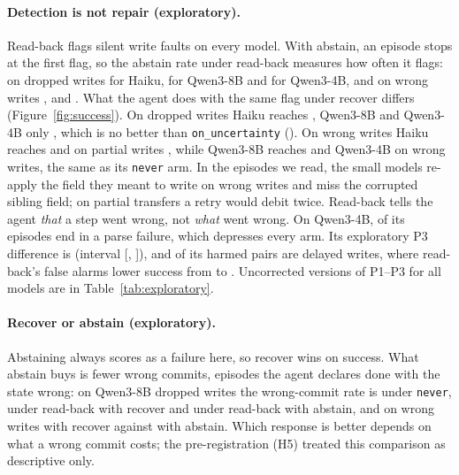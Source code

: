 \paragraph{Detection is not repair (exploratory).} Read-back flags silent write faults on every
model. With abstain, an episode stops at the first flag, so the abstain rate under read-back measures
how often it flags: on dropped writes \RHaikuDropReadbackAbstainAbstainRate{} for Haiku,
\RQwenEightDropReadbackAbstainAbstainRate{} for Qwen3-8B and \RQwenFourDropReadbackAbstainAbstainRate{}
for Qwen3-4B, and on wrong writes \RHaikuWrongReadbackAbstainAbstainRate{},
\RQwenEightWrongReadbackAbstainAbstainRate{} and \RQwenFourWrongReadbackAbstainAbstainRate{}. What the
agent does with the same flag under recover differs (Figure~\ref{fig:success}). On dropped writes Haiku
reaches \RHaikuDropReadbackSuccess{}, Qwen3-8B \RQwenEightDropReadbackSuccess{} and Qwen3-4B only
\RQwenFourDropReadbackSuccess{}, which is no better than \texttt{on\_uncertainty}
(\RQwenFourDropOnUncSuccess{}). On wrong writes Haiku reaches \RHaikuWrongReadbackSuccess{} and on
partial writes \RHaikuPartialReadbackSuccess{}, while Qwen3-8B reaches
\RQwenEightWrongReadbackSuccess{} and Qwen3-4B \RQwenFourWrongReadbackSuccess{} on wrong writes, the
same as its \texttt{never} arm. In the episodes we read, the small models re-apply the field they meant
to write on wrong writes and miss the corrupted sibling field; on partial transfers a retry would debit
twice. Read-back tells the agent \emph{that} a step went wrong, not \emph{what} went wrong. On
Qwen3-4B, \RExpQwenFourStatusParseFailure{} of its \RExpQwenFourEpisodes{} episodes end in a parse
failure, which depresses every arm. Its exploratory P3 difference is \RExpQwenFourPThreeDiff{}
(interval [\RExpQwenFourPThreeCiLo{}, \RExpQwenFourPThreeCiHi{}]), and \RExpQwenFourPThreeDelayedHarm{}
of its \RExpQwenFourPThreeHarm{} harmed pairs are delayed writes, where read-back's false alarms lower
success from \RQwenFourDelayedNeverSuccess{} to \RQwenFourDelayedBothSuccess{}. Uncorrected versions of P1--P3 for all models are in
Table~\ref{tab:exploratory}.

\paragraph{Recover or abstain (exploratory).} Abstaining always scores as a failure here, so recover
wins on success. What abstain buys is fewer wrong commits, episodes the agent declares done with the
state wrong: on Qwen3-8B dropped writes the wrong-commit rate is \RQwenEightDropNeverWrongCommit{} under
\texttt{never}, \RQwenEightDropReadbackWrongCommit{} under read-back with recover and
\RQwenEightDropReadbackAbstainWrongCommit{} under read-back with abstain, and on wrong writes
\RQwenEightWrongReadbackWrongCommit{} with recover against \RQwenEightWrongReadbackAbstainWrongCommit{}
with abstain. Which response is better
depends on what a wrong commit costs; the pre-registration (H5) treated this comparison as descriptive
only.

